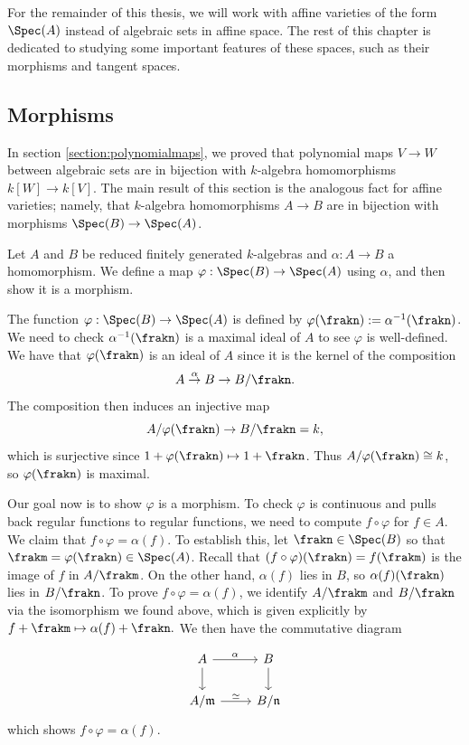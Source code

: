 \documentclass[12pt]{amsart}
\theoremstyle{plain}
\begin{document}
For the remainder of this thesis, we will work with affine varieties of the form $\Spec(A)$ instead of algebraic sets in affine space.
The rest of this chapter is dedicated to studying some important features of these spaces, such as their morphisms and tangent spaces.





\subsection{Morphisms}\label{section:morphisms}
In section \ref{section:polynomialmaps}, we proved that polynomial maps $V \to W$ between algebraic sets are in bijection with $k$-algebra homomorphisms $k[W] \to k[V]$.
The main result of this section is the analogous fact for affine varieties; 
namely, that $k$-algebra homomorphisms $A \to B$ are in bijection with morphisms $\Spec(B) \to \Spec(A)$.

Let $A$ and $B$ be reduced finitely generated $k$-algebras and $\alpha : A \to B$ a homomorphism.
We define a map $\varphi : \Spec(B) \to \Spec(A)$ using $\alpha$, and then show it is a morphism.

The function $\varphi : \Spec(B) \to \Spec(A)$ is defined by $\varphi(\frakn):=\alpha^{-1}(\frakn)$.
We need to check $\alpha^{-1}(\frakn)$ is a maximal ideal of $A$ to see $\varphi$ is well-defined.
We have that $\varphi(\frakn)$ is an ideal of $A$ since it is the kernel of the composition
$$A \overset{\alpha}{\to} B \to B / \frakn.$$ 
The composition then induces an injective map
$$A/\varphi(\frakn) \to B/\frakn = k,$$
which is surjective since $1 + \varphi(\frakn) \mapsto 1 + \frakn$.
Thus $A/\varphi(\frakn) \cong k$, so $\varphi(\frakn)$ is maximal.

Our goal now is to show $\varphi$ is a morphism.
To check $\varphi$ is continuous and pulls back regular functions to regular functions, we need to compute $f \circ \varphi$ for $f \in A$.
We claim that $f \circ \varphi = \alpha(f)$.
To establish this, let $\frakn \in \Spec(B)$ so that $\frakm =\varphi(\frakn) \in \Spec(A)$.
Recall that $(f\circ\varphi)(\frakn) = f(\frakm)$ is the image of $f$ in $A/\frakm$.
On the other hand, $\alpha(f)$ lies in $B$, so $\alpha(f)(\frakn)$ lies in $B/\frakn$.
To prove $f \circ \varphi = \alpha(f)$, we identify $A/\frakm$ and $B/\frakn$ via the isomorphism we found above, which is given explicitly by $f + \frakm \mapsto \alpha(f) + \frakn.$
We then have the commutative diagram

\[\begin{tikzcd}
	A & B \\
	{A/\mathfrak{m}} & {B/\mathfrak{n}}
	\arrow["\alpha", from=1-1, to=1-2]
	\arrow[from=1-1, to=2-1]
	\arrow[from=1-2, to=2-2]
	\arrow["\simeq", from=2-1, to=2-2]
\end{tikzcd}\]
which shows $f\circ\varphi=\alpha(f)$.
\end{document}
